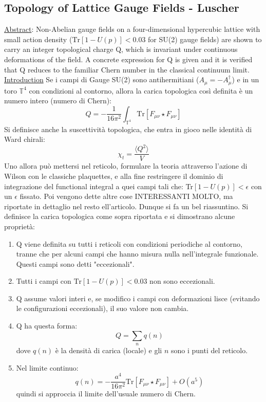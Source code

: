 \documentclass[12pt,a4paper,openright]{article}
\newcommand{\la}{\langle}
\newcommand{\ra}{\rangle}
\begin{document}
\subsection{Topology of Lattice Gauge Fields - Luscher}
\underline{Abstract}: Non-Abelian gauge fields on a four-dimensional hypercubic lattice
with small action density ($\text{Tr}[1-U(p)]<0.03$ for SU(2) gauge fields) are
shown to carry an integer topological charge Q, which is invariant under
continuous deformations of the field. A concrete expression for Q is given and
it is verified that Q reduces to the familiar Chern number in the classical
continuum limit.
\newline \newline
\underline{Introduction} \newline
Se i campi di Gauge SU(2) sono antihermitiani ($A_{\mu} = - A_{\mu}^\dagger$) e in un toro $\mathbb T^4$ con condizioni al contorno, allora la carica topologica così definita è un numero intero (numero di Chern):
\begin{equation*}
  Q = - \frac{1}{16 \pi^2} \int_{\mathbb T^4} \text{Tr}\left[ F_{\mu\nu} \star F_{\mu\nu} \right]
\end{equation*}
Si definisce anche la suscettività topologica, che entra in gioco nelle identità di Ward chirali:
\begin{equation*}
  \chi_{t} = \frac{\la Q^2 \ra}{V}
\end{equation*}
Uno allora può mettersi nel reticolo, formulare la teoria attraverso l'azione di Wilson con le classiche plaquettes, e alla fine restringere il dominio di integrazione del functional integral a quei campi tali che: Tr$\left[1-U(p)\right] < \epsilon$ con un $\epsilon$ fissato.
Poi vengono dette altre cose INTERESSANTI MOLTO, ma riportate in dettaglio nel resto ell'articolo.
Dunque si fa un bel riassuntino. Si definisce la carica topologica come sopra riportata e si dimostrano alcune proprietà:
\begin{enumerate}
  \item Q viene definita su tutti i reticoli con condizioni periodiche al contorno, tranne che per alcuni campi che hanno misura nulla nell'integrale funzionale. Questi campi sono detti "eccezionali".
  \item Tutti i campi con $\text{Tr}[1-U(p)]<0.03$ non sono eccezionali.
  \item Q assume valori interi e, se modifico i campi con deformazioni lisce (evitando le configurazioni eccezionali), il suo valore non cambia.
  \item Q ha questa forma: $$ Q = \sum_n q(n)$$ dove $q(n)$ è la densità di carica (locale) e gli $n$ sono i punti del reticolo.
  \item Nel limite continuo: $$q(n) = -\frac{a^4}{16\pi^2} \text{Tr}\left[F_{\mu\nu}\star F_{\mu\nu}\right] + O(a^5)$$ quindi si approccia il limite dell'usuale numero di Chern.
\end{enumerate}
\end{document}
